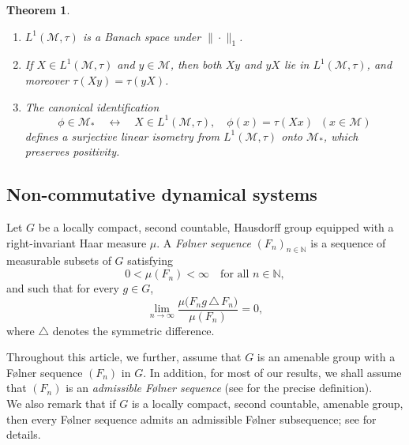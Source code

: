 \documentclass[11pt]{amsart}
\newtheorem{thm}{Theorem}[section]
\theoremstyle{definition}
\theoremstyle{myremark}
\numberwithin{equation}{section}
\begin{document}
\begin{thm}\label{predual prop}
\begin{enumerate}
    \item \(L^{1}(\mathcal{M},\tau)\) is a Banach space under \(\|\cdot\|_1\).
    \item If \(X \in L^{1}(\mathcal{M},\tau)\) and \(y \in \mathcal{M}\), then both \(Xy\) and \(yX\) lie in \(L^{1}(\mathcal{M},\tau)\), and moreover \(\tau(Xy)=\tau(yX)\).
    \item The canonical identification
    \[
    \phi \in \mathcal{M}_* \quad \longleftrightarrow \quad 
    X \in L^{1}(\mathcal{M},\tau), \quad 
    \phi(x) = \tau(Xx) \;\; (x\in \mathcal{M})
    \]
    defines a surjective linear isometry from \(L^{1}(\mathcal{M},\tau)\) onto \(\mathcal{M}_*\), which preserves positivity.
\end{enumerate}
\end{thm}





\subsection{Non-commutative dynamical systems}
Let $G$ be a locally compact, second countable, Hausdorff group equipped with a
right-invariant Haar measure $\mu$.
A \emph{Følner sequence} $(F_n)_{n \in \mathbb{N}}$ is a sequence of measurable subsets
of $G$ satisfying
\[
0 < \mu(F_n) < \infty \quad \text{for all } n \in \mathbb{N},
\]
and such that for every $g \in G$,
\[
\lim_{n \to \infty}
\frac{\mu\bigl(F_n g \,\triangle\, F_n\bigr)}{\mu(F_n)} = 0,
\]
where $\triangle$ denotes the symmetric difference.

Throughout this article,  we further, assume that $G$ is an amenable group with a Følner sequence
$(F_n)$   in $G$. In addition, for most of our results,
we shall assume that $(F_n)$ is an \emph{admissible Følner sequence}
(see \cite{cadilhac2022noncommutative} for the precise definition).\\

\noindent We also remark that if $G$ is a locally compact, second countable, amenable group,
then every Følner sequence admits an admissible Følner subsequence; see \cite{cadilhac2022noncommutative} for details. 
\end{document}
